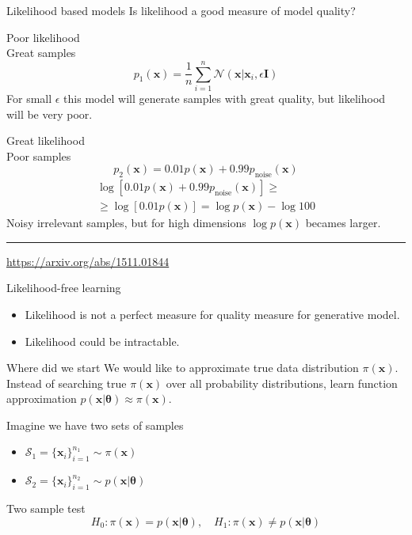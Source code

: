 \documentclass{beamer}
\newcommand{\bx}{\mathbf{x}}
\newcommand{\bI}{\mathbf{I}}
\newcommand{\cN}{\mathcal{N}}
\newcommand{\cS}{\mathcal{S}}
\newcommand{\btheta}{\boldsymbol{\theta}}
\begin{document}
\begin{frame}{Likelihood based models}
	Is likelihood a good measure of model quality?
	\begin{minipage}[t]{0.48\columnwidth}
		\begin{block}{Poor likelihood \\ Great samples}
			\vspace{-0.3cm}
			\[
				p_1(\bx) = \frac{1}{n} \sum_{i=1}^n \cN(\bx | \bx_i, \epsilon \bI)
			\]
			For small $\epsilon$ this model will generate samples with great quality, but likelihood will be very poor.
		\end{block}
	\end{minipage}%
	\begin{minipage}[t]{0.52\columnwidth}
		\begin{block}{Great likelihood \\ Poor samples}
			\vspace{-0.3cm}
			\[
				p_2(\bx) = 0.01p(\bx) + 0.99p_{\text{noise}}(\bx)
			\]
			\begin{multline*}
				\log \left[ 0.01p(\bx) + 0.99p_{\text{noise}}(\bx) \right] \geq  \\ \geq \log \left[ 0.01p(\bx) \right]  = \log p(\bx) - \log 100
			\end{multline*}
		Noisy irrelevant samples, but for high dimensions $\log p(\bx)$ becames larger.
		\end{block}
	\end{minipage}
	\vfill
	\hrule\medskip
	{\scriptsize \href{https://arxiv.org/abs/1511.01844}{https://arxiv.org/abs/1511.01844}}
\end{frame}
\begin{frame}{Likelihood-free learning}
	\begin{itemize}
		\item Likelihood is not a perfect measure for quality measure for generative model.
		\item Likelihood could be intractable.
	\end{itemize}
	\begin{block}{Where did we start}
	 We would like to approximate true data distribution $\pi(\bx)$.
		Instead of searching true $\pi(\bx)$ over all probability distributions, learn function approximation $p(\bx | \btheta) \approx \pi(\bx)$.
	\end{block}
	Imagine we have two sets of samples 
	\begin{itemize}
		\item $\cS_1 = \{\bx_i\}_{i=1}^{n_1} \sim \pi(\bx)$
		\item $\cS_2 = \{\bx_i\}_{i=1}^{n_2} \sim p(\bx | \btheta)$
	\end{itemize}
	\begin{block}{Two sample test}
		\vspace{-0.3cm}
		\[
			H_0: \pi(\bx) = p(\bx | \btheta), \quad H_1: \pi(\bx) \neq p(\bx | \btheta)
		\]
	\end{block}

\end{frame}
\end{document}
